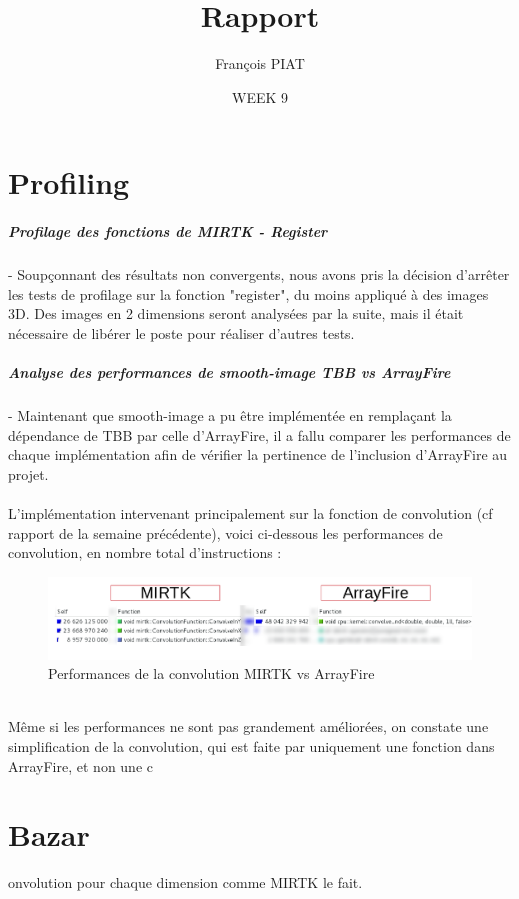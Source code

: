 \documentclass{report}
\title{Rapport}
\author{François PIAT}
\date{WEEK 9}
\begin{document}
\maketitle

\chapter*{Profiling}
\paragraph{Profilage des fonctions de MIRTK - Register}

- Soupçonnant des résultats non convergents, nous avons pris la décision d'arrêter les tests de profilage sur la fonction "register", du moins appliqué à des images 3D. Des images en 2 dimensions seront analysées par la suite, mais il était nécessaire de libérer le poste pour réaliser d'autres tests.\\

\paragraph{Analyse des performances de smooth-image TBB vs ArrayFire}

- Maintenant que smooth-image a pu être implémentée en remplaçant la dépendance de TBB par celle d'ArrayFire, il a fallu comparer les performances de chaque implémentation afin de vérifier la pertinence de l'inclusion d'ArrayFire au projet.\\
\\
L'implémentation intervenant principalement sur la fonction de convolution (cf rapport de la semaine précédente), voici ci-dessous les performances de convolution, en nombre total d'instructions : 
\begin{figure}[h!]
	\begin{center}
		\includegraphics[width=19cm]{figures/MIRTK-AF-smoothimage.png}
	\end{center}	
	\caption{Performances de la convolution MIRTK vs ArrayFire}
	\label{Performances de la convolution MIRTK vs ArrayFire}
\end{figure}
\\Même si les performances ne sont pas grandement améliorées, on constate une simplification de la convolution, qui est faite par uniquement une fonction dans ArrayFire, et non une c\chapter*{Bazar}onvolution pour chaque dimension comme MIRTK le fait.
\end{document}
